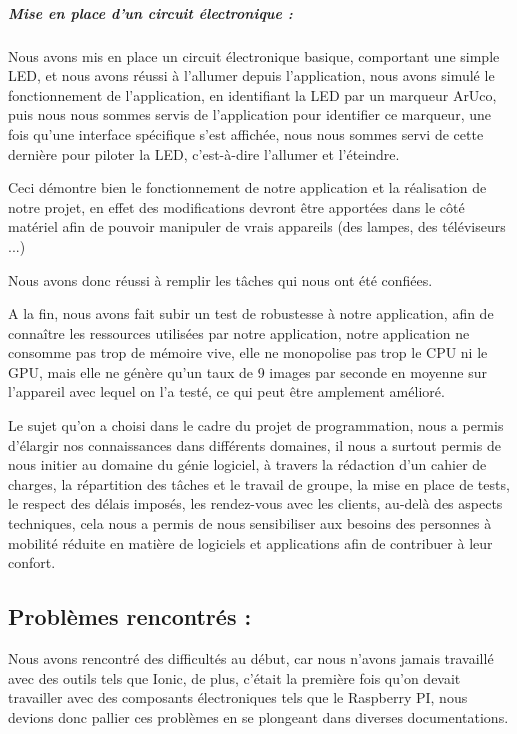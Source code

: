 \documentclass[12pt,a4paper]{article}
\begin{document}
\subparagraph{Mise en place d'un circuit électronique :}

Nous avons mis en place un circuit électronique basique, comportant une simple LED, et nous avons réussi à l'allumer depuis l'application, nous avons simulé le fonctionnement de l'application, en identifiant la LED par un marqueur ArUco, puis nous nous sommes servis de l'application pour identifier ce marqueur, une fois qu'une interface spécifique s'est affichée, nous nous sommes servi de cette dernière pour piloter la LED, c'est-à-dire l'allumer et l'éteindre.\par

Ceci démontre bien le fonctionnement de notre application et la réalisation de notre projet, en effet des modifications devront être apportées dans le côté matériel afin de pouvoir manipuler de vrais appareils (des lampes, des téléviseurs ...)\par

Nous avons donc réussi à remplir les tâches qui nous ont été confiées.\par

A la fin, nous avons fait subir un test de robustesse à notre application, afin de connaître les ressources utilisées par notre application, notre application ne consomme pas trop de mémoire vive, elle ne monopolise pas trop le CPU ni le GPU, mais elle ne génère qu'un taux de 9 images par seconde en moyenne sur l'appareil avec lequel on l'a testé, ce qui peut être amplement amélioré.\par


Le sujet qu'on a choisi dans le cadre du projet de programmation, nous a permis d'élargir nos connaissances dans différents domaines, il nous a surtout permis de nous initier au domaine du génie logiciel, à travers la rédaction d'un cahier de charges, la répartition des tâches et le travail de groupe, la mise en place de tests, le respect des délais imposés, les rendez-vous avec les clients, au-delà des aspects techniques, cela nous a permis de nous sensibiliser aux besoins des personnes à mobilité réduite en matière de logiciels et applications afin de contribuer à leur confort.\par

\subsection*{Problèmes rencontrés :}

Nous avons rencontré des difficultés au début, car nous n'avons jamais travaillé avec des outils tels que Ionic, de plus, c'était la première fois qu'on devait travailler avec des composants électroniques tels que le Raspberry PI, nous devions donc pallier ces problèmes en se plongeant dans diverses documentations. \par
\end{document}
